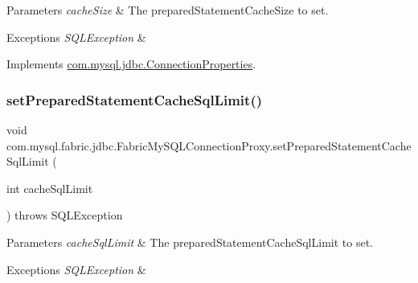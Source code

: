 \begin{DoxyParams}{Parameters}
{\em cache\+Size} & The prepared\+Statement\+Cache\+Size to set. \\
\hline
\end{DoxyParams}

\begin{DoxyExceptions}{Exceptions}
{\em S\+Q\+L\+Exception} & \\
\hline
\end{DoxyExceptions}


Implements \mbox{\hyperlink{interfacecom_1_1mysql_1_1jdbc_1_1_connection_properties_ad65dad2e98f66f1b4a8d1aff24cbc2d5}{com.\+mysql.\+jdbc.\+Connection\+Properties}}.

\mbox{\label{classcom_1_1mysql_1_1fabric_1_1jdbc_1_1_fabric_my_s_q_l_connection_proxy_a6ac81153a1a5ec00beb700533a56fa5f}} 
\subsubsection{\texorpdfstring{set\+Prepared\+Statement\+Cache\+Sql\+Limit()}{setPreparedStatementCacheSqlLimit()}}
{\footnotesize\ttfamily void com.\+mysql.\+fabric.\+jdbc.\+Fabric\+My\+S\+Q\+L\+Connection\+Proxy.\+set\+Prepared\+Statement\+Cache\+Sql\+Limit (\begin{DoxyParamCaption}\item[{int}]{cache\+Sql\+Limit }\end{DoxyParamCaption}) throws S\+Q\+L\+Exception}


\begin{DoxyParams}{Parameters}
{\em cache\+Sql\+Limit} & The prepared\+Statement\+Cache\+Sql\+Limit to set. \\
\hline
\end{DoxyParams}

\begin{DoxyExceptions}{Exceptions}
{\em S\+Q\+L\+Exception} & \\
\hline
\end{DoxyExceptions}



